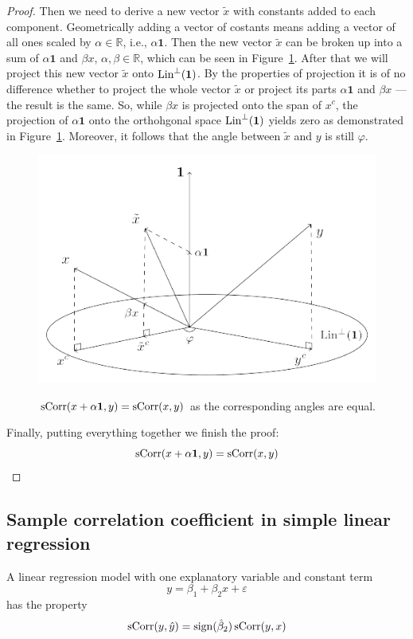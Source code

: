 \begin{proof}
Then we need to derive a new vector $\tilde x$ with constants added to each component.
Geometrically adding a vector of costants means adding a vector of all ones
scaled by $\alpha \in \mathbb{R}$, i.e., $\alpha \mathbf{1}$.
Then the new vector $\tilde x$ can be broken up into a sum of $\alpha \mathbf{1}$ and
$\beta x$, $\alpha, \beta \in \mathbb{R}$, which can be seen in Figure~\ref{fig:corr_final}.
After that we will project this new vector $\tilde x$ onto $\operatorname{Lin}^{\perp}(\mathbf{1})$.
By the properties of projection it is of no difference whether to project
the whole vector $\tilde x$ or project its parts $\alpha \mathbf{1}$
and $\beta x$ — the result is the same.
So, while $\beta x$ is projected onto the span of $x^c$, the projection of $\alpha \mathbf{1}$
onto the orthohgonal space $\operatorname{Lin}^{\perp}(\mathbf{1})$ yields zero as demonstrated
in Figure~\ref{fig:corr_final}.
Moreover, it follows that the angle between $\tilde x$ and $y$ is still $\varphi$.

\begin{figure}
\begin{center}
\includegraphics[width=0.6\linewidth]{figures/02_correlation_constant_proof.pdf}
\label{fig:corr_final}
\caption{$\operatorname{sCorr}(x + \alpha \mathbf{1}, y) = \operatorname{sCorr}(x,y)$ as the corresponding angles are equal.}
\end{center}
\end{figure}


Finally, putting everything together we finish the proof:
\[
\operatorname{sCorr}(x + \alpha \mathbf{1}, y) = \operatorname{sCorr}(x,y)
\]
\end{proof}


\subsection{Sample correlation coefficient in simple linear regression}

\begin{theorem}
A linear regression model with one explanatory variable and constant term
\[
y = \beta_1 + \beta_2 x + \varepsilon
\]
has the property
\[
\operatorname{sCorr}(y, \hat y) = \operatorname{sign}(\hat \beta_2) \operatorname{sCorr}(y, x)
\]
\end{theorem}


